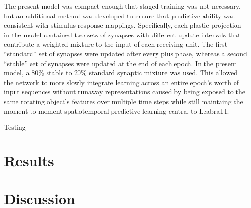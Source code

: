 \documentclass[dwyatte_dissertation.tex]{subfiles}
\begin{document}
The present model was compact enough that staged training was not necessary, but an additional method was developed to ensure that predictive ability was consistent with stimulus-response mappings. Specifically, each plastic projection in the model contained two sets of synapses with different update intervals that contribute a weighted mixture to the input of each receiving unit. The first ``standard'' set of synapses were updated after every plus phase, whereas a second ``stable'' set of synapses were updated at the end of each epoch. In the present model, a 80\% stable to 20\% standard synaptic mixture was used. This allowed the network to more slowly integrate learning across an entire epoch's worth of input sequences without runaway representations caused by being exposed to the same rotating object's features over multiple time steps while still maintaing the moment-to-moment spatiotemporal predictive learning central to LeabraTI.

Testing




\section{Results}

\section{Discussion}



\end{document}
